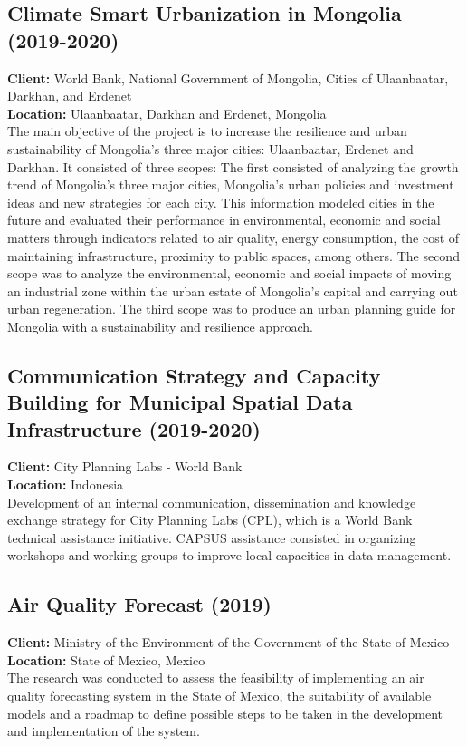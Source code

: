 \documentclass[
	a4paper,
	12pt,
	unnumberedsections,
]{CSSullivanBusinessReport}
\begin{document}
\subsection{Climate Smart Urbanization in Mongolia (2019-2020)}
\textbf{Client:}  World Bank, National Government of Mongolia, Cities of Ulaanbaatar, Darkhan, and Erdenet \\
\textbf{Location:}  Ulaanbaatar, Darkhan and Erdenet, Mongolia \\[0.5em]
 The main objective of the project is to increase the resilience and urban sustainability of Mongolia's three major cities: Ulaanbaatar, Erdenet and Darkhan. It consisted of three scopes: The first consisted of analyzing the growth trend of Mongolia's three major cities, Mongolia's urban policies and investment ideas and new strategies for each city. This information modeled cities in the future and evaluated their performance in environmental, economic and social matters through indicators related to air quality, energy consumption, the cost of maintaining infrastructure, proximity to public spaces, among others. The second scope was to analyze the environmental, economic and social impacts of moving an industrial zone within the urban estate of Mongolia's capital and carrying out urban regeneration. The third scope was to produce an urban planning guide for Mongolia with a sustainability and resilience approach.

\subsection{Communication Strategy and Capacity Building for Municipal Spatial Data Infrastructure (2019-2020)}
\textbf{Client:}  City Planning Labs - World Bank \\
\textbf{Location:}  Indonesia  \\[0.5em]
 Development of an internal communication, dissemination and knowledge exchange strategy for City Planning Labs (CPL), which is a World Bank technical assistance initiative. CAPSUS assistance consisted in organizing workshops and working groups to improve local capacities in data management.

\subsection{Air Quality Forecast (2019)}
\textbf{Client:}  Ministry of the Environment of the Government of the State of Mexico \\
\textbf{Location:}  State of Mexico, Mexico \\[0.5em]
 The research was conducted to assess the feasibility of implementing an air quality forecasting system in the State of Mexico, the suitability of available models and a roadmap to define possible steps to be taken in the development and implementation of the system.
\end{document}
